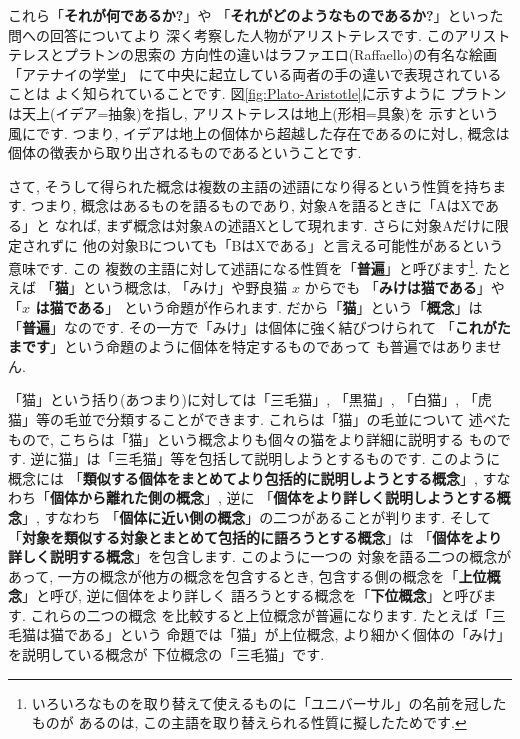 \documentclass[b5j,8pt,twocolumn]{ltjsarticle}
\begin{document}
これら「\textbf{それが何であるか?}」や
「\textbf{それがどのようなものであるか?}」といった問への回答についてより
深く考察した人物がアリストテレスです. このアリストテレスとプラトンの思索の
方向性の違いはラファエロ(Raffaello)の有名な絵画「アテナイの学堂」
\cite{アテナイ}にて中央に起立している両者の手の違いで表現されていることは
よく知られていることです. 図\ref{fig:Plato-Aristotle}に示すように
プラトンは天上(イデア=抽象)を指し, アリストテレスは地上(形相=具象)を
示すという風にです. つまり, イデアは地上の個体から超越した存在であるのに対し,
 概念は個体の徴表から取り出されるものであるということです.
\newline

さて, そうして得られた概念は複数の主語の述語になり得るという性質を持ちます.
 つまり, 概念はあるものを語るものであり, 対象Aを語るときに「AはXである」と
なれば, まず概念は対象Aの述語Xとして現れます. さらに対象Aだけに限定されずに
他の対象Bについても「BはXである」と言える可能性があるという意味です. この
複数の主語に対して述語になる性質を「\textbf{普遍}」と呼びます\footnote{
いろいろなものを取り替えて使えるものに「ユニバーサル」の名前を冠したものが
あるのは, この主語を取り替えられる性質に擬したためです.}. たとえば
「\textbf{猫}」という概念は, 「みけ」や野良猫 $x$ からでも
「\textbf{みけは猫である}」や 「\textbf{$x$ は猫である}」
という命題が作られます. だから「\textbf{猫}」という「\textbf{概念}」は
「\textbf{普遍}」なのです. その一方で「みけ」は個体に強く結びつけられて
「\textbf{これがたまです}」という命題のように個体を特定するものであって
も普遍ではありません.
\newline

「猫」という括り(あつまり)に対しては「三毛猫」, 「黒猫」, 「白猫」,
 「虎猫」等の毛並で分類することができます. これらは「猫」の毛並について
述べたもので, こちらは「猫」という概念よりも個々の猫をより詳細に説明する
ものです. 逆に猫」は「三毛猫」等を包括して説明しようとするものです.
 このように概念には
「\textbf{類似する個体をまとめてより包括的に説明しようとする概念}」,
 すなわち「\textbf{個体から離れた側の概念}」, 逆に
「\textbf{個体をより詳しく説明しようとする概念}」, すなわち
「\textbf{個体に近い側の概念}」の二つがあることが判ります. そして
「\textbf{対象を類似する対象とまとめて包括的に語ろうとする概念}」は
「\textbf{個体をより詳しく説明する概念}」を包含します. このように一つの
対象を語る二つの概念があって, 一方の概念が他方の概念を包含するとき,
 包含する側の概念を「\textbf{上位概念}」と呼び, 逆に個体をより詳しく
語ろうとする概念を「\textbf{下位概念}」と呼びます. これらの二つの概念
を比較すると上位概念が普遍になります. たとえば「三毛猫は猫である」という
命題では「猫」が上位概念, より細かく個体の「みけ」を説明している概念が
下位概念の「三毛猫」です.
\newline
\end{document}
